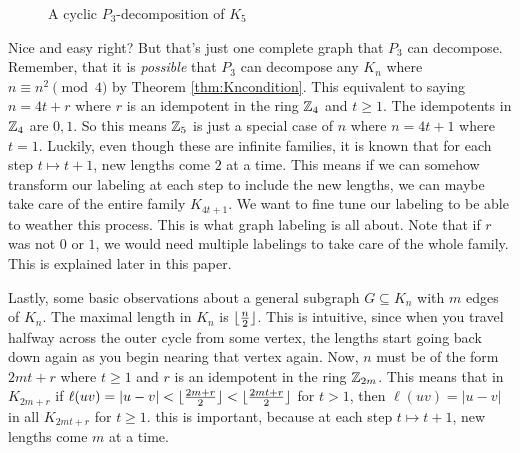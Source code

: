 \begin{figure}[H]
\begin{center}
  \end{center}
  \caption{A cyclic $P_{3}$-decomposition of $K_{5}$}
  \label{fig:P3K5colordecomp}
\end{figure}

Nice and easy right? But that's just one complete graph that $P_{3}$ can decompose. Remember, that it is \textit{possible} that $P_{3}$ can decompose any $K_{n}$ where $n\equiv n^{2} \pmod{4}$ by Theorem \ref{thm:Kncondition}. This equivalent to saying $n=4t+r$ where $r$ is an idempotent in the ring $\mathbb{Z}_{4}$ and $t\geq 1$. The idempotents in $\mathbb{Z}_{4}$ are $0,1$. So this means $\mathbb{Z}_{5}$ is just a special case of $n$ where $n=4t+1$ where $t=1$. Luckily, even though these are infinite families, it is known that for each step $t\mapsto t+1$, new lengths come $2$ at a time. This means if we can somehow transform our labeling at each step to include the new lengths, we can maybe take care of the entire family $K_{4t+1}$. We want to fine tune our labeling to be able to weather this process. This is what graph labeling is all about. Note that if $r$ was not $0$ or $1$, we would need multiple labelings to take care of the whole family. This is explained later in this paper.

Lastly, some basic observations about a general subgraph $G\subseteq K_{n}$ with $m$ edges of $K_{n}$. The maximal length in $K_{n}$ is $\lfloor\frac{n}{2}\rfloor$. This is intuitive, since when you travel halfway across the outer cycle from some vertex, the lengths start going back down again as you begin nearing that vertex again. Now, $n$ must be of the form $2mt+r$ where $t\geq 1$ and $r$ is an idempotent in the ring $\mathbb{Z}_{2m}$. This means that in $K_{2m+r}$ if $\ell(uv)=|u-v|<\lfloor\frac{2m+r}{2}\rfloor<\lfloor\frac{2mt+r}{2}\rfloor$ for $t>1$, then $\ell(uv)=|u-v|$ in all $K_{2mt+r}$ for $t\geq 1$. this is important, because at each step $t\mapsto t+1$, new lengths come $m$ at a time.

